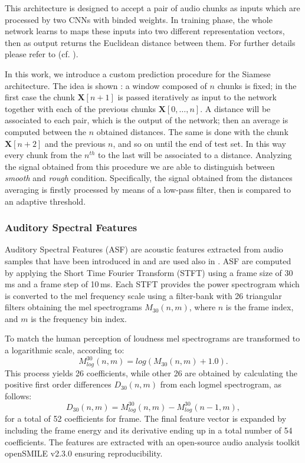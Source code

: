 This architecture is designed to accept a pair of audio chunks as inputs which are processed by two CNNs with binded weights. In training phase, the whole network learns to maps these inputs into two different representation vectors, then as output returns the Euclidean distance between them. For further details please refer to (cf. ).

In this work, we introduce a custom prediction procedure for the Siamese architecture. The idea is shown : a window composed of $n$ chunks is fixed; in the first case the chunk $\mathbf{X}[n+1]$ is passed iteratively as input to the network together with each of the previous chunks $\mathbf{X}[0,\dots,n]$. A distance will be associated to each pair, which is the output of the network; then an average is computed between the $n$ obtained distances. 
The same is done with the chunk $\mathbf{X}[n+2]$  and the previous $n$, and so on until the end of test set. In this way every chunk from the $n^{th}$ to the last will be associated to a distance. Analyzing the signal obtained from this procedure we are able to distinguish between \textit{smooth} and \textit{rough} condition. Specifically, the signal obtained from the distances averaging is firstly processed by means of a low-pass filter, then is compared to an adaptive threshold.



\subsubsection{Auditory Spectral Features}

Auditory Spectral Features (ASF) are acoustic features extracted from audio samples that have been introduced in \cite{eyben2010universal} and are used also in \cite{abdic2016detecting}. ASF are computed by applying the Short Time Fourier Transform (STFT) using a frame size of 30\,ms and a frame step of 10\,ms. Each STFT provides the power spectrogram which is converted to the mel frequency scale using a filter-bank with 26 triangular filters obtaining the mel spectrograms $M_{30}(n,m)$, where $n$ is the
frame index, and $m$ is the frequency bin index.

To match the human perception of loudness mel spectrograms are transformed to a logarithmic scale, according to:
\begin{equation}
M_{log}^{30}(n,m) = log(M_{30}(n,m) + 1.0).
\end{equation}
This process yields 26 coefficients, while other 26 are obtained by calculating the positive first order differences $D_{30}(n,m)$ from each logmel spectrogram, as follows:
\begin{equation}
D_{30}(n,m)  = M_{log}^{30}(n,m)-M_{log}^{30}(n-1,m),
\end{equation}
for a total of 52 coefficients for frame. The final feature vector is expanded by including the frame energy and its derivative ending up in a total number of 54 coefficients. %
The features are extracted with an open-source audio analysis toolkit openSMILE v2.3.0 \cite{Eyben13-RDI} ensuring reproducibility.

